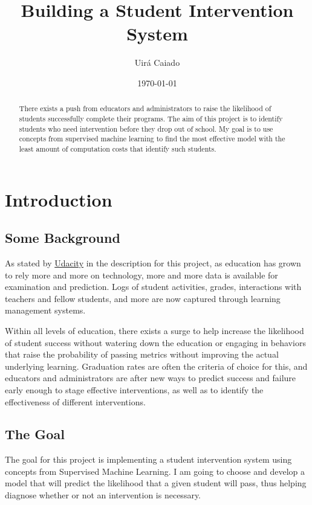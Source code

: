 \documentclass[a4paper]{article}
\title{Building a Student Intervention System}
\author{Uirá Caiado}
\date{\today}
\begin{document}
\maketitle

\begin{abstract}
There exists a push from educators and administrators to raise the likelihood of students successfully complete their programs. The aim of this project is to identify students who need intervention before they drop out of school. My goal is to use concepts from supervised machine learning to find the most effective model with the least amount of computation costs that identify such students.
\end{abstract}


\section{Introduction}
\label{sec:introduction}

\subsection{Some Background}
As stated by \href{https://www.udacity.com/course/viewer#!/c-nd009/l-5446988865/m-5446493941}{Udacity} in the description for this project, as education has grown to rely more and more on technology, more and more data is available for examination and prediction. Logs of student activities, grades, interactions with teachers and fellow students, and more are now captured through learning management systems.

Within all levels of education, there exists a surge to help increase the likelihood of student success without watering down the education or engaging in behaviors that raise the probability of passing metrics without improving the actual underlying learning. Graduation rates are often the criteria of choice for this, and educators and administrators are after new ways to predict success and failure early enough to stage effective interventions, as well as to identify the effectiveness of different interventions.

\subsection{The Goal}
The goal for this project is implementing a student intervention system using concepts from Supervised Machine Learning. I am going to choose and develop a model that will predict the likelihood that a given student will pass, thus helping diagnose whether or not an intervention is necessary.
\end{document}
